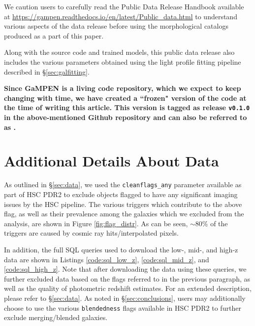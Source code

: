 \documentclass[linenumbers,twocolumn,twocolappendix]{aastex631}
\newcommand\gampen{GaMPEN}
\begin{document}
\begin{CJK*}{UTF8}{gbsn}
We caution users to carefully read the Public Data Release Handbook available at \href{https://gampen.readthedocs.io/en/latest/Public_data.html}{\url{https://gampen.readthedocs.io/en/latest/Public_data.html}} to understand various aspects of the data release before using the morphological catalogs produced as a part of this paper. 

Along with the source code and trained models, this public data release also includes the various parameters obtained using the light profile fitting pipeline described in \S \ref{sec:galfitting}.

\textbf{Since \gampen{} is a living code repository, which we expect to keep changing with time, we have created a ``frozen" version of the code at the time of writing this article. This version is tagged as release \texttt{v0.1.0} in the above-mentioned Github repository and can also be referred to as \citet{gampen_first_release}.}

\section{Additional Details About Data}\label{ap:data}

As outlined in \S\ref{sec:data}, we used the \texttt{cleanflags\_any} parameter available as part of HSC PDR2 to exclude objects flagged to have any significant imaging issues by the HSC pipeline. The various triggers which contribute to the above flag, as well as their prevalence among the galaxies which we excluded from the analysis, are shown in Figure \ref{fig:flag_distr}. As can be seen, $\sim80\%$ of the triggers are caused by cosmic ray hits/interpolated pixels. 


In addition, the full SQL queries used to download the low-, mid-, and high-z data are shown in Listings \ref{code:sql_low_z}, \ref{code:sql_mid_z}, and \ref{code:sql_high_z}. Note that after downloading the data using these queries, we further excluded data based on the flags referred to in the previous paragraph, as well as the quality of photometric redshift estimates. For an extended description, please 
refer to \S \ref{sec:data}. As noted in \S \ref{sec:conclusions}, users may additionally choose to use the various \texttt{blendedness} flags available in HSC PDR2 to further exclude merging/blended galaxies. 


\end{CJK*}
\end{document}
